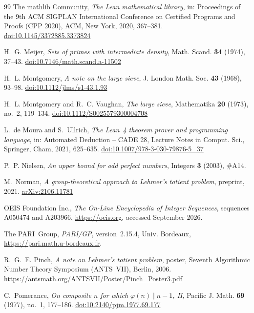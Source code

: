\documentclass[11pt,reqno]{amsart}
\numberwithin{equation}{section}
\theoremstyle{plain}
\theoremstyle{definition}
\theoremstyle{remark}
\begin{document}
\begin{thebibliography}{99}
The mathlib Community,
\emph{The Lean mathematical library},
in: Proceedings of the 9th ACM SIGPLAN International Conference on
Certified Programs and Proofs (CPP 2020), ACM, New York, 2020, 367--381.
\href{https://doi.org/10.1145/3372885.3373824}{doi:10.1145/3372885.3373824}

H.~G. Meijer,
\emph{Sets of primes with intermediate density},
Math. Scand. \textbf{34} (1974), 37--43.
\href{https://doi.org/10.7146/math.scand.a-11502}{doi:10.7146/math.scand.a-11502}

H.~L. Montgomery,
\emph{A note on the large sieve},
J. London Math. Soc. \textbf{43} (1968), 93--98.
\href{https://doi.org/10.1112/jlms/s1-43.1.93}{doi:10.1112/jlms/s1-43.1.93}

H.~L. Montgomery and R.~C. Vaughan,
\emph{The large sieve},
Mathematika \textbf{20} (1973), no.~2, 119--134.
\href{https://doi.org/10.1112/S0025579300004708}{doi:10.1112/S0025579300004708}

L.~de Moura and S.~Ullrich,
\emph{The Lean~4 theorem prover and programming language},
in: Automated Deduction -- CADE 28, Lecture Notes in Comput. Sci.,
Springer, Cham, 2021, 625--635.
\href{https://doi.org/10.1007/978-3-030-79876-5_37}{doi:10.1007/978-3-030-79876-5\_37}

P.~P. Nielsen,
\emph{An upper bound for odd perfect numbers},
Integers \textbf{3} (2003), \#A14.

M.~Norman,
\emph{A group-theoretical approach to Lehmer's totient problem},
preprint, 2021.
\href{https://arxiv.org/abs/2106.11781}{arXiv:2106.11781}

OEIS Foundation Inc.,
\emph{The On-Line Encyclopedia of Integer Sequences},
sequences A050474 and A203966, \url{https://oeis.org}, accessed
September 2026.

The PARI~Group,
\emph{PARI/GP}, version~2.15.4, Univ. Bordeaux,
\url{https://pari.math.u-bordeaux.fr}.

R.~G.~E. Pinch,
\emph{A note on Lehmer's totient problem},
poster, Seventh Algorithmic Number Theory Symposium (ANTS~VII), Berlin, 2006.
\url{https://antsmath.org/ANTSVII/Poster/Pinch_Poster3.pdf}

C.~Pomerance,
\emph{On composite $n$ for which $\varphi(n)\mid n-1$, II},
Pacific J. Math. \textbf{69} (1977), no.~1, 177--186.
\href{https://doi.org/10.2140/pjm.1977.69.177}{doi:10.2140/pjm.1977.69.177}


\end{thebibliography}
\end{document}
